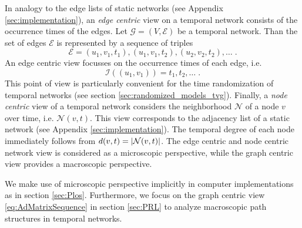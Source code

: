 In analogy to the edge lists of static networks (see Appendix \ref{sec:implementation}), an \emph{edge centric} view on a temporal network consists of the occurrence times of the edges.
Let $\mathcal{G}=(V,\mathcal{E})$ be a temporal network.
Than the set of edges $\mathcal{E}$ is represented by a sequence of triples
\begin{equation*}%
\mathcal{E}=(u_1,v_1,t_1),(u_1,v_1,t_2),(u_2,v_2,t_2),\dots \;.
\end{equation*}
An edge centric view focusses on the occurrence times of each edge, i.e.
\[
\mathcal{I}((u_1,v_1))=t_1,t_2,\dots \; .
\]
This point of view is particularly convenient for the time randomization of temporal networks (see section \ref{sec:randomized_models_tvg}).
Finally, a \emph{node centric} view of a temporal network considers the neighborhood $\mathcal{N}$ of a node $v$ over time, i.e. $\mathcal{N}(v,t)$.
This view corresponds to the adjacency list of a static network (see Appendix \ref{sec:implementation}).
The temporal degree of each node immediately follows from $d(v,t)=\left| \mathcal{N}(v,t) \right|$.
The edge centric and node centric network view is considered as a microscopic perspective, while the graph centric view provides a macroscopic perspective.

We make use of microscopic perspective implicitly in computer implementations as in section \ref{sec:Plos}.
Furthermore, we focus on the graph centric view \eqref{eq:AdMatrixSequence} in section \ref{sec:PRL} to analyze macroscopic path structures in temporal networks.

